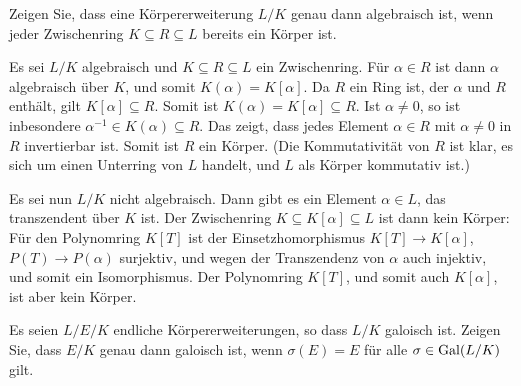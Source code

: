 \begin{question}
  Zeigen Sie, dass eine Körpererweiterung $L/K$ genau dann algebraisch ist, wenn jeder Zwischenring $K \subseteq R \subseteq L$ bereits ein Körper ist.
\end{question}


\begin{solution}
  Es sei $L/K$ algebraisch und $K \subseteq R \subseteq L$ ein Zwischenring.
  Für $\alpha \in R$ ist dann $\alpha$ algebraisch über $K$, und somit $K(\alpha) = K[\alpha]$.
  Da $R$ ein Ring ist, der $\alpha$ und $R$ enthält, gilt $K[\alpha] \subseteq R$.
  Somit ist $K(\alpha) = K[\alpha] \subseteq R$.
  Ist $\alpha \neq 0$, so ist inbesondere $\alpha^{-1} \in K(\alpha) \subseteq R$.
  Das zeigt, dass jedes Element $\alpha \in R$ mit $\alpha \neq 0$ in $R$ invertierbar ist.
  Somit ist $R$ ein Körper.
  (Die Kommutativität von $R$ ist klar, es sich um einen Unterring von $L$ handelt, und $L$ als Körper kommutativ ist.)
  
  Es sei nun $L/K$ nicht algebraisch.
  Dann gibt es ein Element $\alpha \in L$, das transzendent über $K$ ist.
  Der Zwischenring $K \subseteq K[\alpha] \subseteq L$ ist dann kein Körper:
  Für den Polynomring $K[T]$ ist der Einsetzhomorphismus $K[T] \to K[\alpha]$, $P(T) \to P(\alpha)$ surjektiv, und wegen der Transzendenz von $\alpha$ auch injektiv, und somit ein Isomorphismus.
  Der Polynomring $K[T]$, und somit auch $K[\alpha]$, ist aber kein Körper.
\end{solution}


\begin{question}
  Es seien $L/E/K$ endliche Körpererweiterungen, so dass $L/K$ galoisch ist.
  Zeigen Sie, dass $E/K$ genau dann galoisch ist, wenn $\sigma(E) = E$ für alle $\sigma \in \operatorname{Gal}(L/K)$ gilt.
\end{question}


